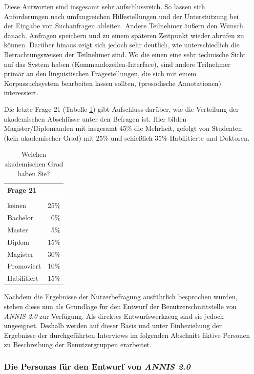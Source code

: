 Diese Antworten sind insgesamt sehr aufschlussreich. So lassen sich Anforderungen nach umfangreichen Hilfestellungen und der Unterstützung bei der Eingabe von Suchanfragen ableiten. Andere Teilnehmer äußern den Wunsch danach, Anfragen speichern und zu einem späteren Zeitpunkt wieder abrufen zu können. Darüber hinaus zeigt sich jedoch sehr deutlich, wie unterschiedlich die Betrachtungsweisen der Teilnehmer sind. Wo die einen eine sehr technische Sicht auf das System haben (Kommandozeilen-Interface), sind andere Teilnehmer primär an den linguistischen Fragestellungen, die sich mit einem Korpussuchsystem bearbeiten lassen sollten, (prosodische Annotationen) interessiert.

Die letzte Frage 21 (Tabelle \ref{tab:Frage21}) gibt Aufschluss darüber, wie die Verteilung der akademischen Abschlüsse unter den Befragen ist. Hier bilden Magister/Diplomanden mit insgesamt 45\% die Mehrheit, gefolgt von Studenten (kein akademischer Grad) mit 25\% und schießlich 35\% Habilitierte und Doktoren.
	
	\begin{table}[H]
		\centering
		\begin{tabular}{l | r}
					Frage 21 &  \\
					\hline\\
					keinen		& 25\% \\
					Bachelor		&  0\% \\
					Master		&  5\% \\
					Diplom		& 15\% \\
					Magister		& 30\% \\
					Promoviert	& 10\% \\
					Habilitiert 		& 15\%
		\end{tabular}
		\caption{Welchen akademischen Grad haben Sie?}\label{tab:Frage21}
	\end{table}

Nachdem die Ergebnisse der Nutzerbefragung ausführlich besprochen wurden, stehen diese nun als Grundlage für den Entwurf der Benutzerschnittstelle von \emph{ANNIS 2.0} zur Verfügung. Als direktes Entwurfswerkzeug sind sie jedoch ungeeignet. Deshalb werden auf dieser Basis und unter Einbeziehung der Ergebnisse der durchgeführten Interviews im folgenden Abschnitt fiktive Personen zu Beschreibung der Benutzergruppen erarbeitet.

\subsubsection{Die Personas für den Entwurf von \emph{ANNIS 2.0}}\label{sec:Personas}

